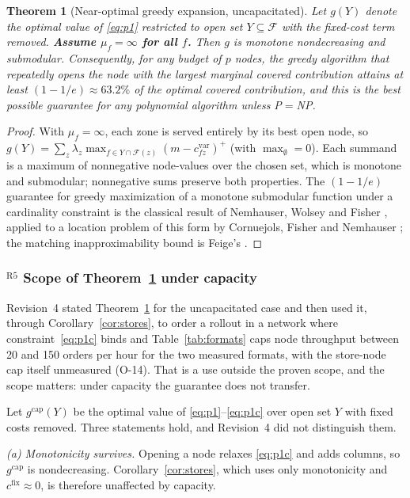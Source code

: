 \documentclass[10pt,twocolumn,letterpaper]{article}
\newtheorem{theorem}{Theorem}
\theoremstyle{definition}
\begin{document}
\begin{theorem}[Near-optimal greedy expansion, uncapacitated]\label{thm:greedy}
Let $g(Y)$ denote the optimal value of \eqref{eq:p1} restricted to open set $Y\subseteq\mathcal{F}$ with the fixed-cost term removed. \textbf{Assume $\mu_f=\infty$ for all $f$.} Then $g$ is monotone nondecreasing and submodular. Consequently, for any budget of $p$ nodes, the greedy algorithm that repeatedly opens the node with the largest marginal covered contribution attains at least $(1-1/e)\approx 63.2\%$ of the optimal covered contribution, and this is the best possible guarantee for any polynomial algorithm unless P${=}$NP.
\end{theorem}
\begin{proof}
With $\mu_f=\infty$, each zone is served entirely by its best open node, so $g(Y)=\sum_z\lambda_z\max_{f\in Y\cap\mathcal{F}(z)}(m-c^{\mathrm{var}}_{fz})^+$ (with $\max_\emptyset=0$). Each summand is a maximum of nonnegative node-values over the chosen set, which is monotone and submodular; nonnegative sums preserve both properties. The $(1-1/e)$ guarantee for greedy maximization of a monotone submodular function under a cardinality constraint is the classical result of Nemhauser, Wolsey and Fisher \cite{nemhauser1978}, applied to a location problem of this form by Cornuejols, Fisher and Nemhauser \cite{cornuejols1977}; the matching inapproximability bound is Feige's \cite{feige1998}.
\end{proof}

\subsubsection*{$^{\mathrm{R5}}$ Scope of Theorem~\ref{thm:greedy} under capacity}\label{sec:capacitated}

Revision~4 stated Theorem~\ref{thm:greedy} for the uncapacitated case and then used it, through Corollary~\ref{cor:stores}, to order a rollout in a network where constraint~\eqref{eq:p1c} binds and Table~\ref{tab:formats} caps node throughput between 20 and 150 orders per hour for the two measured formats, with the store-node cap itself unmeasured (O-14). That is a use outside the proven scope, and the scope matters: under capacity the guarantee does not transfer.

Let $g^{\mathrm{cap}}(Y)$ be the optimal value of \eqref{eq:p1}--\eqref{eq:p1c} over open set $Y$ with fixed costs removed. Three statements hold, and Revision~4 did not distinguish them.

\emph{(a) Monotonicity survives.} Opening a node relaxes \eqref{eq:p1c} and adds columns, so $g^{\mathrm{cap}}$ is nondecreasing. Corollary~\ref{cor:stores}, which uses only monotonicity and $c^{\mathrm{fix}}\approx0$, is therefore unaffected by capacity.
\end{document}
